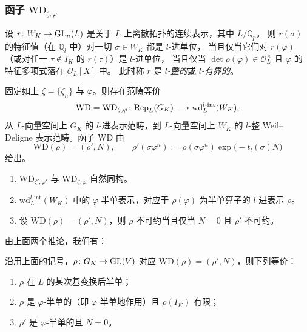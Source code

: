 \subsubsection{函子 $\mathrm{WD}_{\zeta,\varphi}$}

设 $r\colon W_K\to\mathrm{GL}_n(L)$ 是关于 $L$ 上离散拓扑的连续表示，其中 $L/\mathbb{Q}_p$。
则 $r(\sigma)$ 的特征值（在 $\overline{\mathbb{Q}}_l$ 中）对一切 $\sigma\in W_K$ 都是 $l$-进单位，
当且仅当它们对 $r(\varphi)$（或对任一 $\tau\notin I_K$ 的 $r(\tau)$）是 $l$-进单位，
当且仅当 $\det\rho(\varphi)\in\mathcal{O}_L^{\times}$ 且 $\varphi$ 的特征多项式落在 $\mathcal{O}_L[X]$ 中。
此时称 $r$ 是 \emph{$l$-整的}或 \emph{$l$-有界的}。

\begin{corollary}
固定如上 $\zeta=\{\zeta_n\}$ 与 $\varphi$。则存在范畴等价
\[
\mathrm{WD}=\mathrm{WD}_{\zeta,\varphi}\colon \mathrm{Rep}_L(G_K)\longrightarrow
\mathrm{wd}^{l\text{-}\mathrm{int}}_L(W_K),
\]
从 $L$-向量空间上 $G_K$ 的 $l$-进表示范畴，到 $L$-向量空间上 $W_K$ 的 $l$-整
Weil--Deligne 表示范畴。函子 $\mathrm{WD}$ 由
\[
\mathrm{WD}(\rho)=(\rho',N),\qquad
\rho'(\sigma\varphi^{n}):=\rho(\sigma\varphi^{n})\exp\bigl(-t_l(\sigma)N\bigr)
\]
给出。
\end{corollary}

\begin{remark}
\leavevmode
\begin{enumerate}[label=(\arabic*),leftmargin=2.2em]
\item $\mathrm{WD}_{\zeta',\varphi'}$ 与 $\mathrm{WD}_{\zeta,\varphi}$ 自然同构。
\item $\mathrm{wd}^{l\text{-}\mathrm{int}}_L(W_K)$ 中的 $\varphi$-半单表示，对应于 $\rho(\varphi)$
      为半单算子的 $l$-进表示 $\rho$。
\item 设 $\mathrm{WD}(\rho)=(\rho',N)$，则 $\rho$ 不可约当且仅当 $N=0$ 且 $\rho'$ 不可约。
\end{enumerate}
\end{remark}

由上面两个推论，我们有：

\begin{corollary}
沿用上面的记号，$\rho\colon G_K\to\mathrm{GL}(V)$ 对应 $\mathrm{WD}(\rho)=(\rho',N)$，则下列等价：
\begin{enumerate}[label=(\arabic*),leftmargin=2.2em]
\item $\rho$ 在 $L$ 的某次基变换后半单；
\item $\rho$ 是 $\varphi$-半单的（即 $\varphi$ 半单地作用）且 $\rho(I_K)$ 有限；
\item $\rho'$ 是 $\varphi$-半单的且 $N=0$。
\end{enumerate}
\end{corollary}

